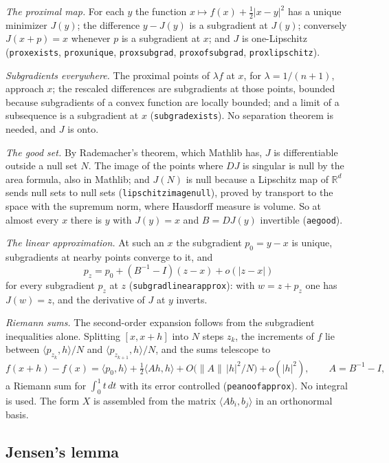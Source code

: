 \documentclass[11pt,reqno]{amsart}
\newcommand{\LEANREF}[1]{\texttt{\small\def\_{\textunderscore\allowbreak}#1}}
\newcommand{\R}{\mathbb{R}}
\theoremstyle{plain}
\theoremstyle{definition}
\begin{document}
\emph{The proximal map.} For each $y$ the function
$x \mapsto f(x) + \tfrac12 |x - y|^2$ has a unique minimizer $J(y)$; the
difference $y - J(y)$ is a subgradient at $J(y)$; conversely $J(x + p) = x$
whenever $p$ is a subgradient at $x$; and $J$ is one-Lipschitz
(\LEANREF{prox\_exists}, \LEANREF{prox\_unique}, \LEANREF{prox\_subgrad},
\LEANREF{prox\_of\_subgrad}, \LEANREF{prox\_lipschitz}).

\emph{Subgradients everywhere.} The proximal points of $\lambda f$ at $x$, for
$\lambda = 1/(n+1)$, approach $x$; the rescaled differences are subgradients at
those points, bounded because subgradients of a convex function are locally
bounded; and a limit of a subsequence is a subgradient at $x$
(\LEANREF{subgrad\_exists}). No separation theorem is needed, and $J$ is onto.

\emph{The good set.} By Rademacher's theorem, which Mathlib has, $J$ is
differentiable outside a null set $N$. The image of the points where $DJ$ is
singular is null by the area formula, also in Mathlib; and $J(N)$ is null
because a Lipschitz map of $\R^d$ sends null sets to null sets
(\LEANREF{lipschitz\_image\_null}), proved by transport to the space with the
supremum norm, where Hausdorff measure is volume. So at almost every $x$ there
is $y$ with $J(y) = x$ and $B = DJ(y)$ invertible (\LEANREF{ae\_good}).

\emph{The linear approximation.} At such an $x$ the subgradient $p_0 = y - x$ is
unique, subgradients at nearby points converge to it, and
\[
  p_z = p_0 + (B^{-1} - I)(z - x) + o(|z - x|)
\]
for every subgradient $p_z$ at $z$ (\LEANREF{subgrad\_linear\_approx}): with
$w = z + p_z$ one has $J(w) = z$, and the derivative of $J$ at $y$ inverts.

\emph{Riemann sums.} The second-order expansion follows from the subgradient
inequalities alone. Splitting $[x, x + h]$ into $N$ steps $z_k$, the increments
of $f$ lie between $\langle p_{z_k}, h\rangle/N$ and
$\langle p_{z_{k+1}}, h\rangle/N$, and the sums telescope to
\[
  f(x + h) - f(x) = \langle p_0, h\rangle + \tfrac12 \langle A h, h\rangle
    + O\bigl(\|A\|\,|h|^2/N\bigr) + o(|h|^2), \qquad A = B^{-1} - I,
\]
a Riemann sum for $\int_0^1 t\,dt$ with its error controlled
(\LEANREF{peano\_of\_approx}). No integral is used. The form $X$ is assembled
from the matrix $\langle A b_i, b_j\rangle$ in an orthonormal basis.

\subsection{Jensen's lemma}\label{ssec:jensen}
\end{document}
